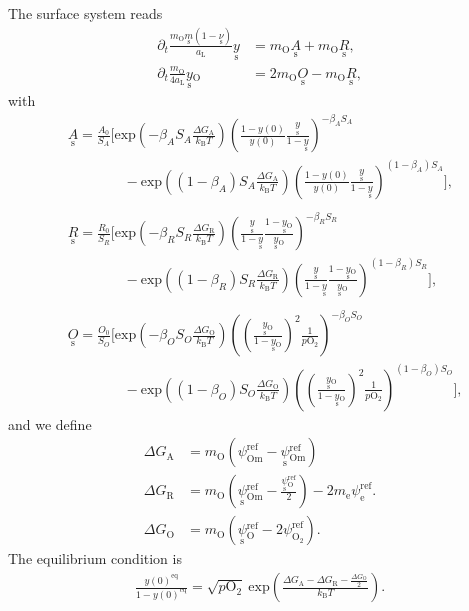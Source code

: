 \documentclass{article}
\numberwithin{equation}{section}
\newcommand{\us}[1]{\underset{\textrm{s}}{#1}{}}
\def\kB{k_\mathrm{B}}
\def\Ox{\mathrm{O}}
\def\OO{\mathrm{O}_2}
\def\aL{a_\mathrm{L}}
\def\ys{\us y}
\def\y0{y(0)}
\def\yOs{\us y_\textrm{O}}
\def\pO2{p\OO}
\def\A0{A_0}
\def\R0{R_0}
\def\K0{O_0}
\def\DGA{\Delta G_\textrm{A}  }
\def\DGR{\Delta G_\textrm{R}  }
\def\DGO{\Delta G_\textrm{O}  }
\def\betaA{\beta_A}
\def\betaR{\beta_R}
\def\betaO{\beta_O}
\def\SA{S_A}
\def\SR{S_R}
\def\SO{S_O}
\def\eq{\textrm{eq}}
\def\REF{\textrm{ref}}
\begin{document}
The surface system reads
\begin{subequations}
\begin{align}
\partial_t \frac{m_\Ox \us m (1- \us \nu)}{\aL} \ys
&=
m_\Ox \us A
+
m_\Ox \us R,
\\
\partial_t \frac{m_\Ox}{4 \aL} \yOs
&=
2 m_\Ox \us O
-
m_\Ox \us R,
\end{align}
\end{subequations}
with
\begin{subequations}
\begin{align}
&\us A
=
\frac{\A0}{\SA}
\Bigg[
	\textrm{exp}
	\left(
		{-\betaA \SA \frac{\DGA}{\kB T}}
	\right)
	\left(
		\frac{1 - \y0}{\y0}
		\frac{\ys}{1-\ys}
	\right)^{-\betaA \SA}
\\ \nonumber
	&\quad \quad \quad \quad	
	-
	\textrm{exp}
	\left(
		{(1-\betaA) \SA \frac{\DGA}{\kB T}}
	\right)
	\left(
		\frac{1 - \y0}{\y0}
		\frac{\ys}{1-\ys}
	\right)^{(1-\betaA) \SA}
\Bigg],
\\ \nonumber
\\
&\us R
=
\frac{\R0}{\SR}
\Bigg[
	\textrm{exp}
	\left(
		{-\betaR \SR \frac{\DGR}{\kB T}}
	\right)
	\left(
		\frac{\ys}{1- \ys}
		\frac{1-\yOs}{\yOs}
	\right)^{-\betaR \SR}
\\ \nonumber
	& \quad \quad \quad \quad	
	-
	\textrm{exp}
	\left(
		{(1 - \betaR) \SR \frac{\DGR}{\kB T}}
	\right)
	\left(
		\frac{\ys}{1- \ys}
		\frac{1-\yOs}{\yOs}
	\right)^{(1-\betaR) \SR}
\Bigg],
\\ \nonumber
\\
&\us O
=
\frac{\K0}{\SO}
\Bigg[
	\textrm{exp}
	\left(
		{-\betaO \SO \frac{\DGO}{\kB T}}
	\right)
	\left(
		\left(
			\frac{\yOs}{1-\yOs}
		\right)^2
		\frac{1}{\pO2}
	\right)^{-\betaO \SO}
\\ \nonumber
	&\quad \quad \quad \quad	
	-
	\textrm{exp}
	\left(
		{(1-\betaO) \SO \frac{\DGO}{\kB T}}
	\right)
	\left(
		\left(
			\frac{\yOs}{1-\yOs}
		\right)^2
		\frac{1}{\pO2}
	\right)^{(1 - \betaO) \SO}
\Bigg],
\end{align}
\end{subequations}
and we define
\begin{subequations}
\begin{align}
\DGA
&=
m_\Ox
\left(
	\psi_{\textrm{Om}}^\REF
	-
	\us \psi_{\textrm{Om}}^\REF
\right)
\\
\DGR
&= 
m_\Ox
\left(
	\us \psi_{\textrm{Om}}^\REF
	-
	\frac{\us \psi_{\Ox}^\REF}{2}
\right)
-
2 m_\textrm{e} \psi_{\textrm{e}}^\REF.
\\
\DGO
&= 
m_\Ox
\left(
	\us \psi_{\Ox}^\REF
	-
	2 \psi_{\OO}^\REF
\right).
\end{align}
\end{subequations}
The equilibrium condition is
\begin{subequations}
\begin{align}
\frac{\y0^\eq}{1-\y0^\eq} = \sqrt{\pO2} \ \textrm{exp}
\left(
	\frac{\DGA - \DGR - \frac{\DGO}{2}}{\kB T}
\right).
\end{align}
\end{subequations}
\end{document}
